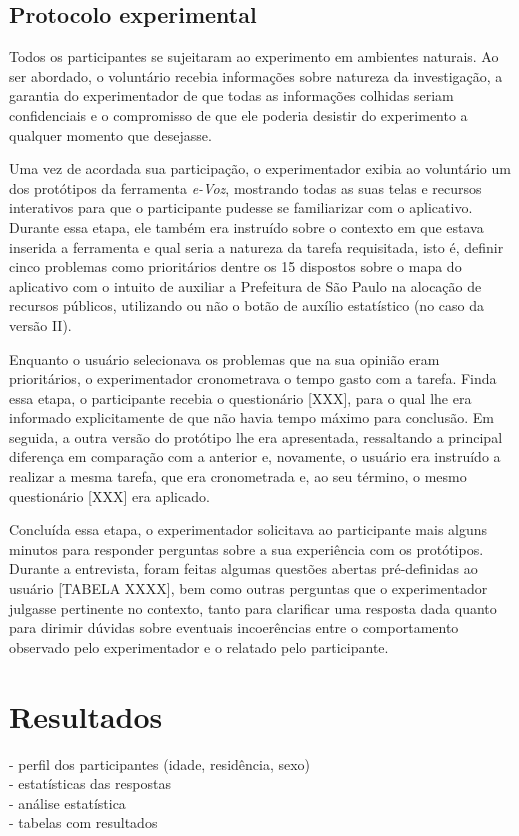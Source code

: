 \documentclass{sigchi}
\begin{document}
\subsection{Protocolo experimental}
Todos os participantes se sujeitaram ao experimento em ambientes naturais. Ao ser abordado, o voluntário recebia informações sobre natureza da investigação, a garantia do experimentador de que todas as informações colhidas seriam confidenciais e o compromisso de que ele poderia desistir do experimento a qualquer momento que desejasse.

Uma vez de acordada sua participação, o experimentador exibia ao voluntário um dos protótipos da ferramenta \textit{e-Voz}, mostrando todas as suas telas e recursos interativos para que o participante pudesse se familiarizar com o aplicativo. Durante essa etapa, ele também era instruído sobre o contexto em que estava inserida a ferramenta e qual seria a natureza da tarefa requisitada, isto é, definir cinco problemas como prioritários dentre os 15 dispostos sobre o mapa do aplicativo com o intuito de auxiliar a Prefeitura de São Paulo na alocação de recursos públicos, utilizando ou não o botão de auxílio estatístico (no caso da versão II).

Enquanto o usuário selecionava os problemas que na sua opinião eram prioritários, o experimentador cronometrava o tempo gasto com a tarefa. Finda essa etapa, o participante recebia o questionário [XXX], para o qual lhe era informado explicitamente de que não havia tempo máximo para conclusão. Em seguida, a outra versão do protótipo lhe era apresentada, ressaltando a principal diferença em comparação com a anterior e, novamente, o usuário era instruído a realizar a mesma tarefa, que era cronometrada e, ao seu término, o mesmo questionário [XXX] era aplicado.

Concluída essa etapa, o experimentador solicitava ao participante mais alguns minutos para responder perguntas sobre a sua experiência com os protótipos. Durante a entrevista, foram feitas algumas questões abertas pré-definidas ao usuário [TABELA XXXX], bem como outras perguntas que o experimentador julgasse pertinente no contexto, tanto para clarificar uma resposta dada quanto para dirimir dúvidas sobre eventuais incoerências entre o comportamento observado pelo experimentador e o relatado pelo participante.





\section{Resultados}
- perfil dos participantes (idade, residência, sexo)\\
- estatísticas das respostas\\
- análise estatística\\
- tabelas com resultados\\
\end{document}
